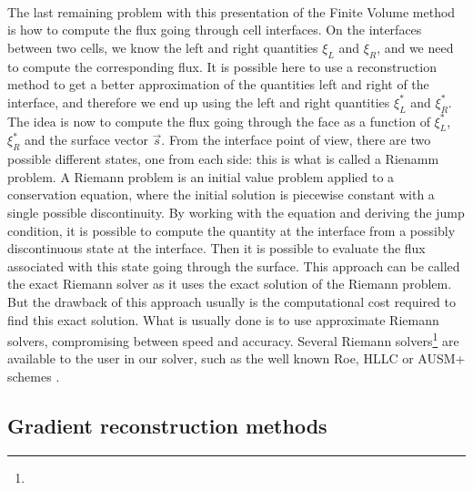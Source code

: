       \paragraph{}
      The last remaining problem with this presentation of the Finite Volume method is how to compute the flux going through cell interfaces.
      On the interfaces between two cells, we know the left and right quantities $\xi_L$ and $\xi_R$, and we need to compute the corresponding flux.
      It is possible here to use a reconstruction method to get a better approximation of the quantities left and right of the interface, and therefore we end up using the left and right quantities $\xi_L^*$ and $\xi_R^*$.
      The idea is now to compute the flux going through the face as a function of $\xi_L^*$, $\xi_R^*$ and the surface vector $\vec{s}$.
      From the interface point of view, there are two possible different states, one from each side: this is what is called a Rienamm problem.
      A Riemann problem is an initial value problem applied to a conservation equation, where the initial solution is piecewise constant with a single possible discontinuity.
      By working with the equation and deriving the jump condition, it is possible to compute the quantity at the interface from a possibly discontinuous state at the interface.
      Then it is possible to evaluate the flux associated with this state going through the surface.
      This approach can be called the exact Riemann solver as it uses the exact solution of the Riemann problem.
      But the drawback of this approach usually is the computational cost required to find this exact solution.
      What is usually done is to use approximate Riemann solvers, compromising between speed and accuracy.
      Several Riemann solvers\footnote{} are available to the user in our solver, such as the well known Roe, HLLC or AUSM+ schemes \cite{Roe1981, Toro2009}.


    \subsection{Gradient reconstruction methods}

